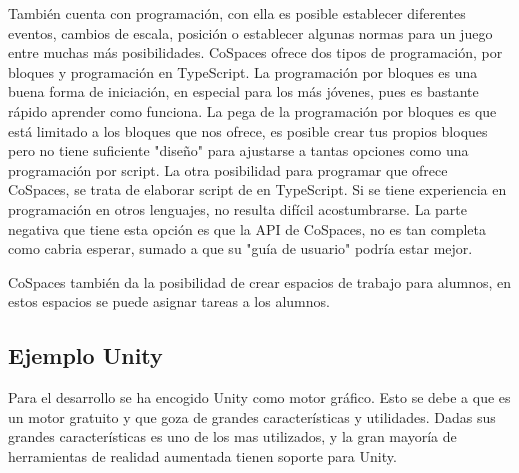 También cuenta con programación, con ella es posible establecer diferentes eventos, cambios de escala, posición o establecer algunas normas para un juego entre muchas más posibilidades. CoSpaces ofrece dos tipos de programación, por bloques y programación en TypeScript. La programación por bloques es una buena forma de iniciación, en especial para los más jóvenes, pues es bastante rápido aprender como funciona. La pega de la programación por bloques es que está limitado a los bloques que nos ofrece, es posible crear tus propios bloques pero no tiene suficiente "diseño" para ajustarse a tantas opciones como una programación por script. 
La otra posibilidad para programar que ofrece CoSpaces, se trata de elaborar script de en TypeScript. Si se tiene experiencia en programación en otros lenguajes, no resulta difícil acostumbrarse. La parte negativa que tiene esta opción es que la API de CoSpaces, no es tan completa como cabria esperar, sumado a que su "guía de usuario" podría estar mejor.





CoSpaces también da la posibilidad de crear espacios de trabajo para alumnos, en estos espacios se puede asignar tareas a los alumnos.
\subsection{Ejemplo Unity}

Para el desarrollo se ha encogido Unity como motor gráfico. Esto se debe a que es un motor gratuito y que goza de grandes características y utilidades. Dadas sus grandes características es uno de los mas utilizados, y la gran mayoría de herramientas de realidad aumentada tienen soporte para Unity.

